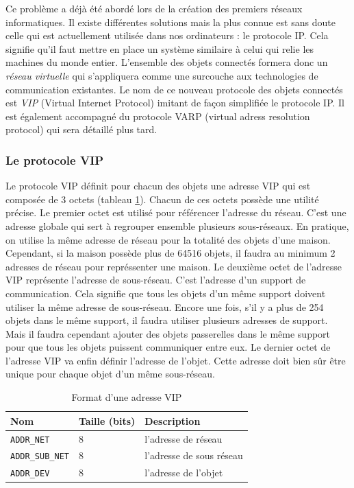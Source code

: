 		Ce problème a déjà été abordé lors de la création des premiers réseaux informatiques. Il 
		existe différentes solutions mais la plus connue est sans doute celle qui est actuellement 
		utilisée dans nos ordinateurs : le protocole IP. Cela signifie qu'il faut mettre en place un
		système similaire à celui qui relie les machines du monde entier. L'ensemble des objets
		connectés formera donc un \emph{réseau virtuelle} qui s'appliquera comme une surcouche aux
		technologies de communication existantes. Le nom de ce nouveau protocole des objets connectés
		est \emph{VIP} (Virtual Internet Protocol) imitant de façon simplifiée le protocole IP. Il
		est également accompagné du protocole VARP (virtual adress resolution protocol) qui sera 
		détaillé plus tard.
		
		\subsubsection{Le protocole VIP}
			Le protocole VIP définit pour chacun des objets une adresse VIP qui est composée de 3 
			octets (tableau \ref{vipFormat}). Chacun de ces octets possède une utilité précise. Le
			premier octet est utilisé pour référencer l'adresse du réseau. C'est une adresse globale
			qui sert à regrouper ensemble plusieurs sous-réseaux. En pratique, on utilise la même
			adresse de réseau pour la totalité des objets d'une maison. Cependant, si la maison
			possède plus de 64516 objets, il faudra au minimum 2 adresses de réseau pour représsenter
			une maison. Le deuxième octet de l'adresse VIP représente l'adresse de sous-réseau. C'est
			l'adresse d'un support de communication. Cela signifie que tous les objets d'un même
			support doivent utiliser la même adresse de sous-réseau. Encore une fois, s'il y a plus
			de 254 objets dans le même support, il faudra utiliser plusieurs adresses de support. Mais
			il faudra cependant ajouter des objets passerelles dans le même support pour que tous les
			objets puissent communiquer entre eux. Le dernier octet de l'adresse VIP va enfin définir
			l'adresse de l'objet. Cette adresse doit bien sûr être unique pour chaque objet d'un même
			sous-réseau.
			
			\begin{table}[ht]
				\centering
				\begin{tabular}{|l|l|l|}
					\hline
					Nom                         & Taille (bits) & Description              \\ 
					\hline\hline
					\texttt{ADDR{\_}NET}        & 8             & l'adresse de réseau      \\ \hline
					\texttt{ADDR{\_}SUB{\_}NET} & 8             & l'adresse de sous réseau \\ \hline
					\texttt{ADDR{\_}DEV}        & 8             & l'adresse de l'objet     \\ \hline
				\end{tabular}
				\caption{Format d'une adresse VIP}
				\label{vipFormat}
			\end{table}
			
